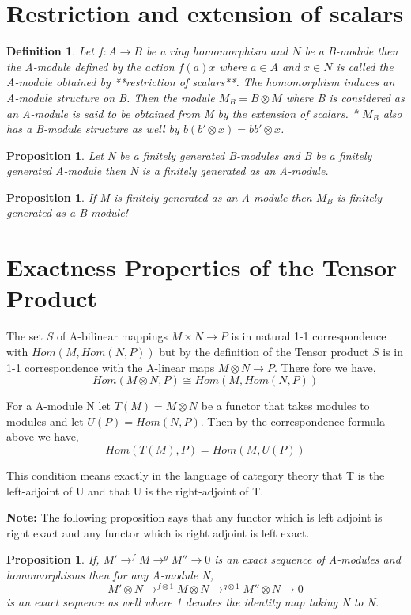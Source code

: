 \documentclass[]{report}
\newtheorem{prop}[theorem]{Proposition}
\newtheorem{defn}[theorem]{Definition}
\begin{document}
\section{ Restriction and extension of scalars}

\begin{defn} 
    Let $f: A \rightarrow B$ be a ring homomorphism and $N$ be a B-module then the A-module defined by the action $f(a)x$ where $a\in A$ and $x\in N$ is called the A-module obtained by **restriction of scalars**.
The homomorphism induces an A-module structure on B. Then the module $M_B = B\otimes M$ where B is considered as an A-module is said to be obtained from M by the extension of scalars.
* $M_B$ also has a B-module structure as well by $b(b'\otimes x) = bb'\otimes x$. 
\end{defn}

\begin{prop} 
    Let N be a finitely generated B-modules and B be a finitely generated A-module then N is a finitely generated as an A-module.
\end{prop}

\begin{prop}
    If M is finitely generated as an A-module then $M_B$ is finitely generated as a B-module!
\end{prop}

\section{Exactness Properties of the Tensor Product}

The set $S$ of A-bilinear mappings $M\times N \rightarrow P$ is in natural 1-1 correspondence with $Hom(M,Hom(N,P))$ but by the definition of the Tensor product $S$ is in 1-1 correspondence with the A-linear maps $M\otimes N \rightarrow P$. There fore we have,
$$Hom(M\otimes N,P) \cong Hom(M,Hom(N,P))$$

For a A-module N let $T(M) = M\otimes N$ be a functor that takes modules to modules and let $U(P) = Hom(N,P)$. Then by the correspondence formula above we have, 
$$Hom(T(M),P) = Hom(M,U(P))$$

This condition means exactly in the language of category theory that T is the left-adjoint of U and that U is the right-adjoint of T. 

\textbf{Note:} The following proposition says that any functor which is left adjoint is right exact and any functor which is right adjoint is left exact. 

\begin{prop}
    If, $M' \rightarrow^f M \rightarrow^g M'' \rightarrow 0$ is an exact sequence of A-modules and homomorphisms then for any A-module N,
$$M'\otimes N \rightarrow^{f\otimes 1} M\otimes N \rightarrow^{g\otimes 1} M''\otimes N \rightarrow 0$$ 
is an exact sequence as well where 1 denotes the identity map taking N to N. 
\end{prop}
\end{document}
